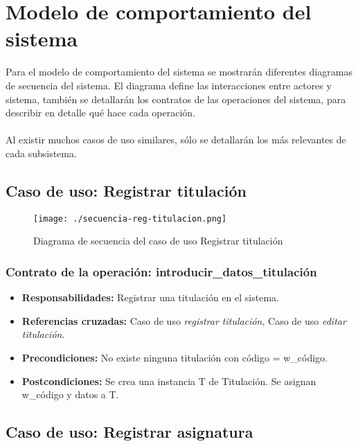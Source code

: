 \section{Modelo de comportamiento del sistema}

Para el modelo de comportamiento del sistema se mostrarán diferentes diagramas de secuencia del sistema. El diagrama define las interacciones entre actores y sistema, también se detallarán los contratos de las operaciones del sistema, para describir en detalle qué hace cada operación.
\paragraph{}
Al existir muchos casos de uso similares, sólo se detallarán los más relevantes de cada subsistema.

\subsection{Caso de uso: Registrar titulación}

\begin{figure}[H] 
  \label{comportamiento-reg-titulacion} 
	\begin{center}
    \texttt{[image: ./secuencia-reg-titulacion.png]}
  \end{center}
\caption{Diagrama de secuencia del caso de uso Registrar titulación}
\end{figure}

\subsubsection{Contrato de la operación: introducir\_datos\_titulación}
\begin{itemize}
\item {\bf Responsabilidades:} Registrar una titulación en el sistema.
\item {\bf Referencias cruzadas:} Caso de uso {\em registrar titulación}, Caso de uso {\em editar titulación}.
\item {\bf Precondiciones:} No existe ninguna titulación con código = w\_código.
\item {\bf Postcondiciones:} Se crea una instancia T de Titulación. Se asignan w\_código y datos a T.
\end{itemize}

\subsection{Caso de uso: Registrar asignatura}

